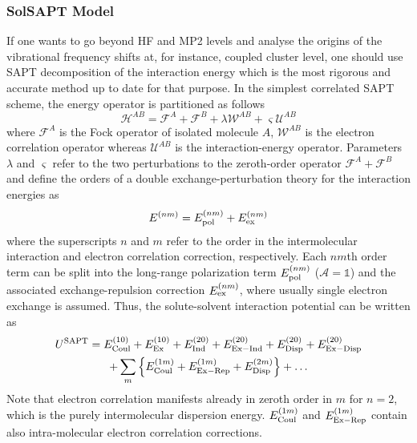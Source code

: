 \documentclass[b5paper,oneside,fleqn,11pt]{book}
\begin{document}
\begin{refsection}
\subsubsection{SolSAPT Model\label{s:solsapt}}

If one wants to go beyond HF and MP2 levels and
analyse the origins of the vibrational frequency 
shifts at, for instance, coupled cluster
level, one should use SAPT decomposition of the interaction
energy which is
the most rigorous and accurate method up to date for that purpose.
In the simplest correlated SAPT scheme, the energy operator
is partitioned as follows
%
\begin{equation}
 \mathscr{H}^{AB} = \mathscr{F}^{A} + \mathscr{F}^{B} + \lambda \mathscr{W}^{AB} + \varsigma \mathscr{U}^{AB}
\end{equation}
%
where $\mathscr{F}^{A}$ is the Fock operator of isolated molecule $A$, 
$\mathscr{W}^{AB}$ is the electron correlation operator 
whereas $\mathscr{U}^{AB}$ is the interaction\hyp{}energy operator.
Parameters $\lambda$ and $\varsigma$ refer to the two perturbations
to the zeroth\hyp{}order operator $\mathscr{F}^{A}+\mathscr{F}^{B}$
and define the orders of a double exchange\hyp{}perturbation theory
for the interaction energies as
%
\begin{equation}
  E^{(nm)} =  E^{(nm)}_{\rm pol} +  E^{(nm)}_{\rm ex}
\end{equation}
%
where the superscripts $n$ and $m$ refer to the order in the
intermolecular interaction and electron correlation correction,
respectively. Each $nm$th order term can be split into the long\hyp{}range
polarization term $E^{(nm)}_{\rm pol}$ ($\mathscr{A}=\mathbb{1}$)
and the associated exchange\hyp{}repulsion correction $E^{(nm)}_{\rm ex}$,
where usually single electron exchange is assumed.
Thus, the solute\hyp{}solvent interaction potential can be written as
%
\begin{multline}
U^{\rm SAPT} =
         E^{(10)}_{\rm Coul} + E^{(10)}_{\rm Ex} + 
         E^{(20)}_{\rm Ind}  + E^{(20)}_{\rm Ex-Ind} +
         E^{(20)}_{\rm Disp} + E^{(20)}_{\rm Ex-Disp} \\ +
     \sum_m \left\{ E^{(1m)}_{\rm Coul} + E^{(1m)}_{\rm Ex-Rep} + E^{(2m)}_{\rm Disp}\right\} 
     + \ldots
\end{multline}
%
Note that electron correlation manifests
already in zeroth order in $m$ for $n=2$, which is the purely intermolecular
dispersion energy. $E^{(1m)}_{\rm Coul}$ and $E^{(1m)}_{\rm Ex-Rep}$
contain also intra\hyp{}molecular electron correlation corrections.

\end{refsection}
\end{document}
